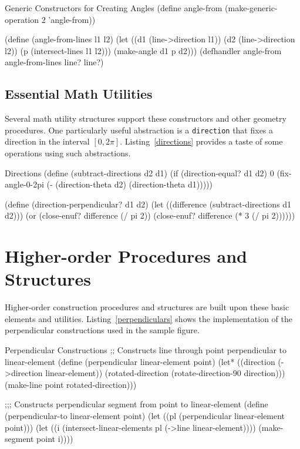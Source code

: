 \begin{code-listing}
[label=angle-from]
{Generic Constructors for Creating Angles}
(define angle-from (make-generic-operation 2 'angle-from))

(define (angle-from-lines l1 l2)
  (let ((d1 (line->direction l1))
        (d2 (line->direction l2))
        (p (intersect-lines l1 l2)))
    (make-angle d1 p d2)))
(defhandler angle-from angle-from-lines line? line?)
\end{code-listing}

\subsection{Essential Math Utilities}

Several math utility structures support these constructors and other
geometry procedures. One particularly useful abstraction is a
\texttt{direction} that fixes a direction in the interval $[0, 2
  \pi]$. Listing~\ref{directions} provides a taste of some operations
using such abstractions.

\begin{code-listing}
[label=directions]
{Directions}
(define (subtract-directions d2 d1)
  (if (direction-equal? d1 d2)
      0
      (fix-angle-0-2pi (- (direction-theta d2)
                          (direction-theta d1)))))

(define (direction-perpendicular? d1 d2)
  (let ((difference (subtract-directions d1 d2)))
    (or (close-enuf? difference (/ pi 2))
        (close-enuf? difference (* 3 (/ pi 2))))))
\end{code-listing}

\section{Higher-order Procedures and Structures}

Higher-order construction procedures and structures are built upon
these basic elements and utilities. Listing~\ref{perpendiculars} shows
the implementation of the perpendicular constructions used in the
sample figure.

\begin{code-listing}
[label=perpendiculars]
{Perpendicular Constructions}
;; Constructs line through point perpendicular to linear-element
(define (perpendicular linear-element point)
  (let* ((direction (->direction linear-element))
         (rotated-direction (rotate-direction-90 direction)))
    (make-line point rotated-direction)))

;;; Constructs perpendicular segment from point to linear-element
(define (perpendicular-to linear-element point)
  (let ((pl (perpendicular linear-element point)))
    (let ((i (intersect-linear-elements pl (->line linear-element))))
      (make-segment point i))))
\end{code-listing}

